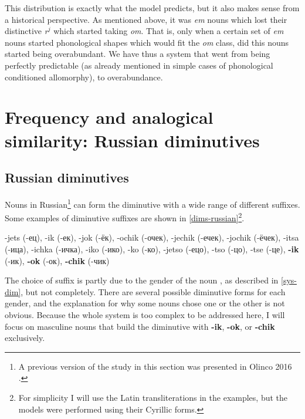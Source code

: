 This distribution is exactly what the model predicts, but it also makes sense from a historical perspective. As mentioned above, it was \textit{em} nouns which lost their distinctive \textit{r}$^j$ which started taking \textit{om}. That is, only when a certain set of \textit{em} nouns started phonological shapes which would fit the \textit{om} class, did this nouns started being overabundant. We have thus a system that went from being perfectly predictable (as already mentioned in simple cases of phonological conditioned allomorphy), to overabundance.


\section{Frequency and analogical similarity: Russian diminutives}


\subsection{Russian diminutives}

Nouns in Russian\footnote{A previous version of the study in this section was presented in Olinco 2016 \autocite{GuzmanNaranjo.2016a}.} can form the diminutive with a wide range of different suffixes. Some examples of diminutive suffixes are shown in \ref{dims-russian}\footnote{For simplicity I will use the Latin transliterations in the examples, but the models were performed using their Cyrillic forms.}.

\begin{exe}
    \ex \label{dims-russian} -jets (-ец), -ik (-ек),  -jok (-ёк), -ochik (-очек), -jechik (-ечек), -jochik (-ёчек), -itsa (-ица), -ichka (-ичка), -iko (-ико), -ko (-ко), -jetso (-ецо), -tso (-цо), -tse (-це),  \textbf{-ik} (-ик),  \textbf{-ok} (-ок),  \textbf{-chik} (-чик)
\end{exe}

The choice of suffix is partly due to the gender of the noun \autocites{Kempe.2001, Kempe.2003}, as described in \ref{sys-dim}, but not completely. There are several possible diminutive forms for each gender, and the explanation for why some nouns chose one or the other is not obvious. Because the whole system is too complex to be addressed here, I will focus on masculine nouns that build the diminutive with \textbf{-ik}, \textbf{-ok}, or \textbf{-chik} exclusively.

